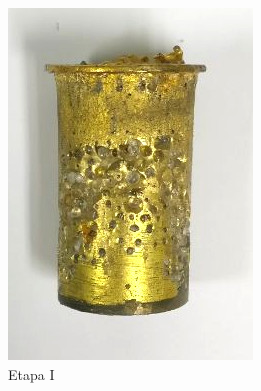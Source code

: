 \documentclass[a4paper,12pt,fleqn,twoside,openany]{book}
\begin{document}
\begin{figure}[h]
 \centering
    \begin{subfigure}{0.30\textwidth}
        \includegraphics[width=\textwidth]{Img/Procedimiento/proceso1.jpg}
        \caption{Etapa I}
        \label{fig:proceso1}
    \end{subfigure}
    \begin{subfigure}{0.35\textwidth}

\end{subfigure}
\end{figure}
\end{document}
